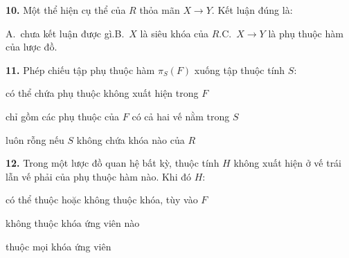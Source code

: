 \documentclass[11pt,a4paper]{article}
\newcommand{\cau}[2]{\par\textbf{#1.} #2\par}
\newcommand{\pangang}[1]{\par{\small\hspace*{2.1em}#1\par}}
\begin{document}
\newpage
\cau{10}{Một thể hiện cụ thể của $R$ thỏa mãn $X\to Y$. Kết luận đúng là:}
\pangang{A.~chưa kết luận được gì.\qquad B.~$X$ là siêu khóa của $R$.\qquad C.~$X\to Y$ là phụ thuộc hàm của lược đồ.}

\cau{11}{Phép chiếu tập phụ thuộc hàm $\pi_S(F)$ xuống tập thuộc tính $S$:}
\begin{pa}
\item có thể chứa phụ thuộc không xuất hiện trong $F$
\item chỉ gồm các phụ thuộc của $F$ có cả hai vế nằm trong $S$
\item luôn rỗng nếu $S$ không chứa khóa nào của $R$
\end{pa}

\cau{12}{Trong một lược đồ quan hệ bất kỳ, thuộc tính $H$ không xuất hiện ở vế trái lẫn vế phải của phụ thuộc hàm nào. Khi đó $H$:}
\begin{pa}
\item có thể thuộc hoặc không thuộc khóa, tùy vào $F$
\item không thuộc khóa ứng viên nào
\item thuộc mọi khóa ứng viên
\end{pa}
\end{document}
